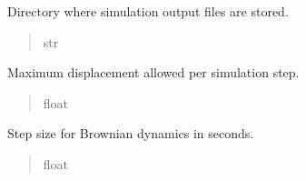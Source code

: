 \documentclass[letterpaper,10pt,english]{sphinxmanual}
\begin{document}
\begin{fulllineitems}
\begin{fulllineitems}
\begin{quote}
\begin{description}
\end{description}\end{quote}

\end{fulllineitems}


\begin{fulllineitems}
\label{\detokenize{src:src.Simulation_Class.Simulation.output_dir}}
\pysigstartsignatures
{}
\pysigstopsignatures
\sphinxAtStartPar
Directory where simulation output files are stored.
\begin{quote}\begin{description}
\sphinxAtStartPar
str

\end{description}\end{quote}

\end{fulllineitems}


\begin{fulllineitems}
\label{\detokenize{src:src.Simulation_Class.Simulation.maximum_move}}
\pysigstartsignatures
{}
\pysigstopsignatures
\sphinxAtStartPar
Maximum displacement allowed per simulation step.
\begin{quote}\begin{description}
\sphinxAtStartPar
float

\end{description}\end{quote}

\end{fulllineitems}


\begin{fulllineitems}
\label{\detokenize{src:src.Simulation_Class.Simulation.bd_step_size_sec}}
\pysigstartsignatures
{}
\pysigstopsignatures
\sphinxAtStartPar
Step size for Brownian dynamics in seconds.
\begin{quote}\begin{description}
\sphinxAtStartPar
float


\end{description}
\end{quote}
\end{fulllineitems}
\end{fulllineitems}
\end{document}
